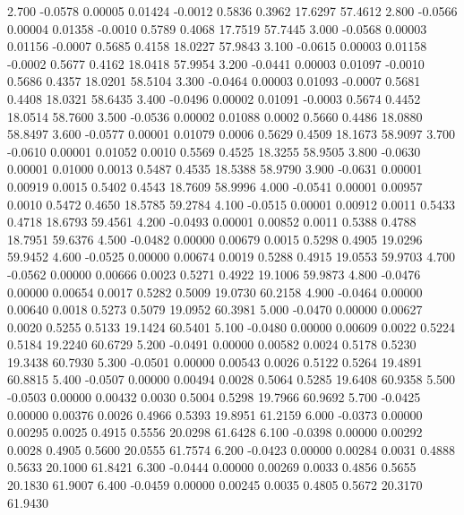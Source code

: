    2.700  -0.0578   0.00005   0.01424  -0.0012   0.5836   0.3962  17.6297  57.4612
   2.800  -0.0566   0.00004   0.01358  -0.0010   0.5789   0.4068  17.7519  57.7445
   3.000  -0.0568   0.00003   0.01156  -0.0007   0.5685   0.4158  18.0227  57.9843
   3.100  -0.0615   0.00003   0.01158  -0.0002   0.5677   0.4162  18.0418  57.9954
   3.200  -0.0441   0.00003   0.01097  -0.0010   0.5686   0.4357  18.0201  58.5104
   3.300  -0.0464   0.00003   0.01093  -0.0007   0.5681   0.4408  18.0321  58.6435
   3.400  -0.0496   0.00002   0.01091  -0.0003   0.5674   0.4452  18.0514  58.7600
   3.500  -0.0536   0.00002   0.01088   0.0002   0.5660   0.4486  18.0880  58.8497
   3.600  -0.0577   0.00001   0.01079   0.0006   0.5629   0.4509  18.1673  58.9097
   3.700  -0.0610   0.00001   0.01052   0.0010   0.5569   0.4525  18.3255  58.9505
   3.800  -0.0630   0.00001   0.01000   0.0013   0.5487   0.4535  18.5388  58.9790
   3.900  -0.0631   0.00001   0.00919   0.0015   0.5402   0.4543  18.7609  58.9996
   4.000  -0.0541   0.00001   0.00957   0.0010   0.5472   0.4650  18.5785  59.2784
   4.100  -0.0515   0.00001   0.00912   0.0011   0.5433   0.4718  18.6793  59.4561
   4.200  -0.0493   0.00001   0.00852   0.0011   0.5388   0.4788  18.7951  59.6376
   4.500  -0.0482   0.00000   0.00679   0.0015   0.5298   0.4905  19.0296  59.9452
   4.600  -0.0525   0.00000   0.00674   0.0019   0.5288   0.4915  19.0553  59.9703
   4.700  -0.0562   0.00000   0.00666   0.0023   0.5271   0.4922  19.1006  59.9873
   4.800  -0.0476   0.00000   0.00654   0.0017   0.5282   0.5009  19.0730  60.2158
   4.900  -0.0464   0.00000   0.00640   0.0018   0.5273   0.5079  19.0952  60.3981
   5.000  -0.0470   0.00000   0.00627   0.0020   0.5255   0.5133  19.1424  60.5401
   5.100  -0.0480   0.00000   0.00609   0.0022   0.5224   0.5184  19.2240  60.6729
   5.200  -0.0491   0.00000   0.00582   0.0024   0.5178   0.5230  19.3438  60.7930
   5.300  -0.0501   0.00000   0.00543   0.0026   0.5122   0.5264  19.4891  60.8815
   5.400  -0.0507   0.00000   0.00494   0.0028   0.5064   0.5285  19.6408  60.9358
   5.500  -0.0503   0.00000   0.00432   0.0030   0.5004   0.5298  19.7966  60.9692
   5.700  -0.0425   0.00000   0.00376   0.0026   0.4966   0.5393  19.8951  61.2159
   6.000  -0.0373   0.00000   0.00295   0.0025   0.4915   0.5556  20.0298  61.6428
   6.100  -0.0398   0.00000   0.00292   0.0028   0.4905   0.5600  20.0555  61.7574
   6.200  -0.0423   0.00000   0.00284   0.0031   0.4888   0.5633  20.1000  61.8421
   6.300  -0.0444   0.00000   0.00269   0.0033   0.4856   0.5655  20.1830  61.9007
   6.400  -0.0459   0.00000   0.00245   0.0035   0.4805   0.5672  20.3170  61.9430
